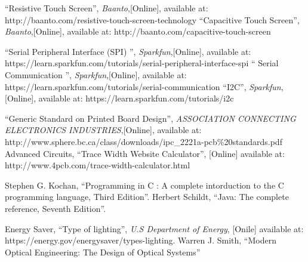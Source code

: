 \begin{thebibliography}{5}
 ``Resistive Touch Screen'', \emph{Baanto},[Online], available at: http://baanto.com/resistive-touch-screen-technology
 ``Capacitive Touch Screen'', \emph{Baanto},[Online], available at: http://baanto.com/capacitive-touch-screen

 ``Serial Peripheral Interface (SPI) '', \emph{Sparkfun},[Online], available at: https://learn.sparkfun.com/tutorials/serial-peripheral-interface-spi
 `` Serial Communication '', \emph{Sparkfun},[Online], available at: https://learn.sparkfun.com/tutorials/serial-communication 
 ``I2C'', \emph{Sparkfun},[Online], available at: https://learn.sparkfun.com/tutorials/i2c


 ``Generic Standard on Printed Board Design'', \emph{ASSOCIATION CONNECTING
ELECTRONICS INDUSTRIES},[Online], available at: http://www.sphere.bc.ca/class/downloads/ipc\_2221a-pcb\%20standards.pdf
 Advanced Circuits, ``Trace Width Website Calculator'', [Online] available at: http://www.4pcb.com/trace-width-calculator.html


 Stephen G. Kochan, ``Programming in C : A complete intorduction to the C programming language, Third Edition''.
 Herbert Schildt, ``Java: The complete reference, Seventh Edition''.

 Energy Saver, ``Type of lighting'', \emph{U.S Department of Energy}, [Onile] available at: https://energy.gov/energysaver/types-lighting.
 Warren J. Smith, ``Modern Optical Engineering: The Design of Optical Systems''



\end{thebibliography}
